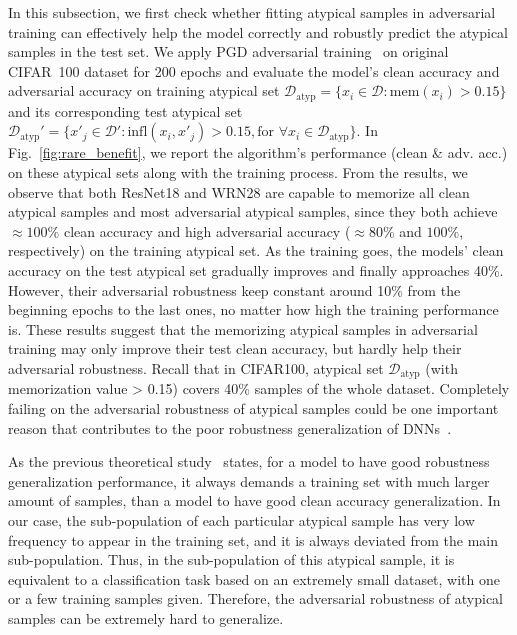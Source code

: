 In this subsection, we first check whether fitting atypical samples in adversarial training can effectively help the model correctly and robustly predict the atypical samples in the test set. We apply PGD adversarial training~\cite{madry2017towards} on original CIFAR~100 dataset for 200 epochs and evaluate the model's clean accuracy and adversarial accuracy on training atypical set $\mathcal{D}_\text{atyp}=\{x_i \in \mathcal{D}: \text{mem}(x_i)> 0.15\}$ and its corresponding test atypical set $\mathcal{D}_\text{atyp}' = \{x'_j \in \mathcal{D}': \text{infl}(x_i,x'_j)> 0.15, \text{for } \forall x_i\in \mathcal{D}_\text{atyp}\}$. In Fig.~\ref{fig:rare_benefit}, we report the algorithm's performance (clean \& adv. acc.) on these atypical sets along with the training process. From the results, we observe that both ResNet18 and WRN28 are capable to memorize all clean atypical samples and most adversarial atypical samples, since they both achieve $\approx100\%$ clean accuracy and high adversarial accuracy ($\approx80\%$ and $100\%$, respectively) on the training atypical set. 
As the training goes, the models' clean accuracy on the test atypical set gradually improves and finally approaches 40\%. 
However, their adversarial robustness keep constant around 10\% from the beginning epochs to the last ones, no matter how high the training performance is. 
These results suggest that the memorizing atypical samples in adversarial training may only improve their test clean accuracy, but hardly help their adversarial robustness. Recall that in CIFAR100, atypical set $\mathcal{D}_\text{atyp}$ (with memorization value > 0.15) covers 40\% samples of the whole dataset. Completely failing on the adversarial robustness of atypical samples could be one important reason that contributes to the poor robustness generalization of DNNs~\cite{rice2020overfitting}.

As the previous theoretical study~\cite{schmidt2018adversarially} states, for a model to have good robustness generalization performance, it always demands a training set with much larger amount of samples, than a model to have good clean accuracy generalization. In our case, the sub-population of each particular atypical sample has very low frequency to appear in the training set, and it is always deviated from the main sub-population. Thus, in the sub-population of this atypical sample, it is equivalent to a classification task based on an extremely small dataset, with one or a few training samples given. Therefore, the adversarial robustness of atypical samples can be extremely hard to generalize. 


